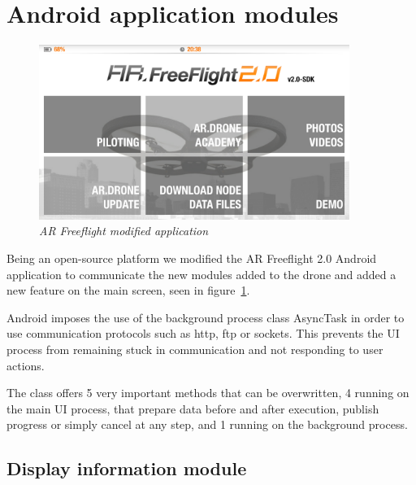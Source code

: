 \section{Android application modules}
 
\begin{figure}[ht]
\begin{center}
\includegraphics[width=0.9\textwidth]{img/android_app.png}
\end{center}
\caption{\small \itshape{AR Freeflight modified application}}
  \label{fig:moded_app}
\end{figure}

Being an open-source platform we modified the AR Freeflight 2.0 Android application to communicate the new modules added to the drone and added a new feature on the main screen, seen in figure~\ref{fig:moded_app}.

Android imposes the use of the background process class AsyncTask in order to use communication protocols such as http, ftp or sockets. This prevents the UI process from remaining stuck in communication and not responding to user actions.

The class offers 5 very important methods that can be overwritten, 4 running on the main UI process, that prepare data before and after execution, publish progress or simply cancel at any step, and 1 running on the background process.

\subsection{Display information module}
 
